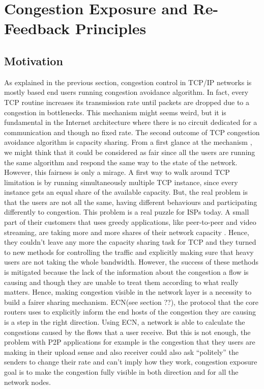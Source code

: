 \section{Congestion Exposure and Re-Feedback Principles}
\subsection{Motivation}

As explained in the previous section, congestion control in TCP/IP networks is mostly based end users running congestion avoidance algorithm. In fact, every TCP routine increases its transmission rate until packets are dropped due to a congestion in bottlenecks. This mechanism might seems weird, but it is fundamental in the Internet architecture where there is no circuit dedicated for a communication and though no fixed rate. The second outcome of TCP congestion avoidance algorithm is capacity sharing. From a first glance at the mechanism , we might think that it could be considered as fair since all the users are  running the same algorithm and respond the same way to the state of the network. However, this fairness is only a mirage. A first way to walk around TCP limitation is by running simultaneously multiple TCP instance, since every instance gets an equal share of the available capacity. But, the real problem is that the users are not all the same, having different behaviours and participating differently to congestion. This problem is a real puzzle for ISPs today. A small part of their customers that uses greedy applications, like peer-to-peer and video streaming, are taking more and more shares of their network capacity \cite{RFC5594}.  Hence, they couldn't leave any more the capacity sharing task for TCP and they turned to new methods for controlling the traffic and explicitly making sure that heavy users are not taking the whole bandwidth. However, the success of these methods is mitigated because the lack of the information about the congestion a flow is causing and though they are unable to treat them according to what really matters. Hence, making congestion visible in the network layer is a necessity to build a fairer sharing mechanism. ECN(see section ??), the protocol that the core routers uses to explicitly inform the end hosts of the congestion they are causing is  a step in the right direction.  Using ECN, a network is able to calculate the congestions caused by the flows that a user receive. But this is not enough, the problem with P2P applications for example is the congestion that they users are making in their upload sense and also receiver could also ask “politely” the senders to change their rate and can't imply how they work,  congestion exposure goal is to make the congestion fully visible in both direction and for all the network nodes.

